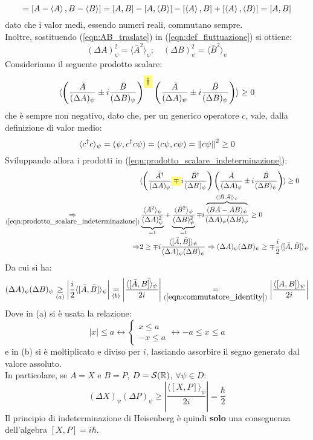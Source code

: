 \documentclass[../../FisicaTeorica.tex]{subfiles}
\begin{document}
\begin{equation}
[\bar{A},\bar{B}]=[A-\avg{A},B-\avg{B}]=[A,B]-[A,\avg{B}]-[\avg{A},B]+[\avg{A},\avg{B}]=[A,B]
\label{eqn:commutatore_identity}
\end{equation}
dato che i valor medi, essendo numeri reali, commutano sempre.\\
Inoltre, sostituendo (\ref{eqn:AB_traslate}) in (\ref{eqn:def_fluttuazione}) si ottiene:
\begin{equation}
(\Delta A)^2_\psi = \langle \bar{A}^2 \rangle_\psi; \quad (\Delta B)^2_\psi = \langle \bar{B}^2 \rangle_\psi
\label{eqn:prodotto_scalare_indeterminazione}
\end{equation}
Consideriamo il seguente prodotto scalare:
\[
\langle \left(\frac{\bar{A}}{(\Delta A)_\psi}\pm i \frac{\bar{B}}{(\Delta B)_\psi} \right)^{\hlc{Yellow}{\dag}} \left ( \frac{\bar{A}}{(\Delta A)_\psi}\pm i \frac{\bar{B}}{(\Delta B)_\psi }\right ) \rangle \geq 0
\]
che è sempre non negativo, dato che, per un generico operatore $c$, vale, dalla definizione di valor medio:
\[
\langle c^\dag c\rangle_\psi = (\psi,c^\dag c \psi)=( c\psi, c\psi ) =\left\lVert c\psi\right\rVert^2 \geq 0
\]
Sviluppando allora i prodotti in (\ref{eqn:prodotto_scalare_indeterminazione}):
\begin{align*}
&\langle \left( \frac{\bar{A}^\dag}{(\Delta A)_\psi}\hlc{Yellow}{\mp} i \frac{\bar{B}^\dag}{(\Delta B)_\psi}\right)\left(\frac{\bar{A}}{(\Delta A)_\psi} \pm i \frac{\bar{B}}{(\Delta B)_\psi}\right)\rangle \geq 0\\
\underset{(\ref{eqn:prodotto_scalare_indeterminazione})}{\Rightarrow} & \underbrace{\frac{\langle \bar{A}^2 \rangle_\psi}{(\Delta A)^2_\psi}}_{=1} +
\underbrace{\frac{\langle \bar{B}^2\rangle_\psi}{(\Delta B)^2_\psi}}_{=1} \mp i \frac{\overbrace{\langle \bar{B}\bar{A}-\bar{A}\bar{B}\rangle_\psi}^{\langle[\bar{B},\bar{A}]\rangle_\psi}}{(\Delta A)_\psi (\Delta B)_\psi}\geq 0\\
\Rightarrow &2 \geq\mp i\frac{\langle [\bar{A},\bar{B}]\rangle_\psi}{(\Delta A)_\psi (\Delta B)_\psi} \Rightarrow (\Delta A)_\psi(\Delta B)_\psi\geq\mp\frac{i}{2}\langle [\bar{A},\bar{B}]\rangle_\psi
\end{align*}
Da cui si ha:
\[
(\Delta A)_\psi(\Delta B)_\psi \underset{(a)}{\geq} \left|\frac{i}{2}\langle[\bar{A},\bar{B}]\rangle_\psi\right|\underset{(b)}{=}\left |\frac{\langle[\bar{A},\bar{B]\rangle_\psi}}{2i}\right|\underset{(\ref{eqn:commutatore_identity})}{=}
\left |\frac{\langle [A,B]\rangle_\psi}{2i} \right |
\]
Dove in (a) si è usata la relazione:
\[
|x|\leq a \leftrightarrow \begin{cases}
x \leq a\\
-x \leq a
\end{cases} \leftrightarrow -a \leq x \leq a
\]
e in (b) si è moltiplicato e diviso per $i$, lasciando assorbire il segno generato dal valore assoluto.\\
In particolare, se $A=X$ e $B=P$, $D=\mathcal{S}(\mathbb{R})$, $\forall \psi \in D$:
\[
(\Delta X)_\psi (\Delta P)_\psi \geq \left | 
\frac{\langle [X,P]\rangle_\psi}{2i}
\right | = \frac{\hbar}{2}
\]
Il principio di indeterminazione di Heisenberg è quindi \textbf{solo} una conseguenza dell'algebra $[X,P]=i\hbar$.
\end{document}
